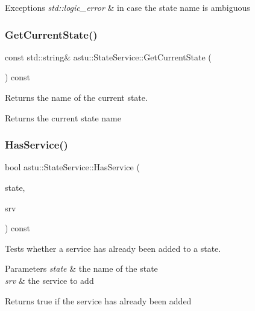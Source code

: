 \begin{DoxyExceptions}{Exceptions}
{\em std\+::logic\+\_\+error} & in case the state name is ambiguous \\
\hline
\end{DoxyExceptions}
\mbox{\label{classastu_1_1StateService_ac643aebb1bfe9880db1bac7533e0ec75}} 
\subsubsection{\texorpdfstring{Get\+Current\+State()}{GetCurrentState()}}
{\footnotesize\ttfamily const std\+::string\& astu\+::\+State\+Service\+::\+Get\+Current\+State (\begin{DoxyParamCaption}{ }\end{DoxyParamCaption}) const}

Returns the name of the current state.

\begin{DoxyReturn}{Returns}
the current state name 
\end{DoxyReturn}
\mbox{\label{classastu_1_1StateService_a611255de384fd0e53fccf30cb53662b6}} 
\subsubsection{\texorpdfstring{Has\+Service()}{HasService()}}
{\footnotesize\ttfamily bool astu\+::\+State\+Service\+::\+Has\+Service (\begin{DoxyParamCaption}\item[{const std\+::string \&}]{state,  }\item[{std\+::shared\+\_\+ptr$<$ \hyperlink{classastu_1_1IService}{I\+Service} $>$}]{srv }\end{DoxyParamCaption}) const}

Tests whether a service has already been added to a state.


\begin{DoxyParams}{Parameters}
{\em state} & the name of the state \\
\hline
{\em srv} & the service to add \\
\hline
\end{DoxyParams}
\begin{DoxyReturn}{Returns}
{\ttfamily true} if the service has already been added 
\end{DoxyReturn}
\mbox{\label{classastu_1_1StateService_adfd94f9b5d622131a1fdcc4dcf5ef51d}} 
